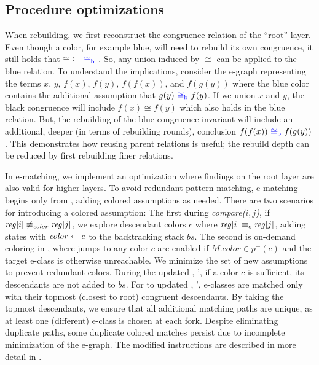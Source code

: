 \subsection{Procedure optimizations}
When rebuilding, we first reconstruct the congruence relation of the ``root'' layer.
Even though a color, for example {\color{blue}blue}, will need to rebuild its own congruence, it still holds that ${\cong}\subseteq{{~\color{blue}\cong_{\mathrm{b}}\,\,}}$.
So, any union induced by ${\cong}$ can be applied to the {\color{blue}blue} relation.
To understand the implications, consider the e-graph representing the terms $x$, $y$, $f(x)$, $f(y)$, $f(f(x))$, and $f(g(y))$ where the {\color{blue}blue} color contains the additional assumption that $g(y) {~\color{blue}\cong_{\mathrm{b}}\,\,} f(y)$.
If we union $x$ and $y$, the black congruence will include $f(x) \cong f(y)$  which also holds in the blue relation.
But, the rebuilding of the blue congruence invariant will include an additional, deeper (in terms of rebuilding rounds), conclusion $f(f(x)) {~\color{blue}\cong_{\mathrm{b}}\,\,} f(g(y))$.
This demonstrates how reusing parent relations is useful; the rebuild depth can be reduced by first rebuilding finer relations.

In e-matching, we implement an optimization where findings on the root layer are also valid for higher layers. 
To avoid redundant pattern matching, e-matching begins only from \croot, adding colored assumptions as needed. 
There are two scenarios for introducing a colored assumption: 
The first during \emph{compare($i, j$)}, if $\mathit{reg}[i] \not \equiv_{\mathit{color}} \mathit{reg}[j]$, we explore descendant colors $c$ where $\mathit{reg}[i] \equiv_c \mathit{reg}[j]$, adding states with $\mathit{color} \gets c$ to the backtracking stack $bs$.
The second is on-demand coloring in \iclrjmp, where jumps to any color $c$ are enabled if $M.color \in p^+(c)$ and the target e-class is otherwise unreachable.
We minimize the set of new assumptions to prevent redundant colors. 
During the updated \icompare, \icompare', if a color $c$ is sufficient, its descendants are not added to $bs$. 
For to updated \iclrjmp, \iclrjmp', e-classes are matched only with their topmost (closest to root) congruent descendants. 
By taking the topmost descendants, we ensure that all additional matching paths are unique, as at least one (different) e-class is chosen at each fork.
Despite eliminating duplicate paths, some duplicate colored matches persist due to incomplete minimization of the e-graph.
The modified instructions are described in more detail in . 

